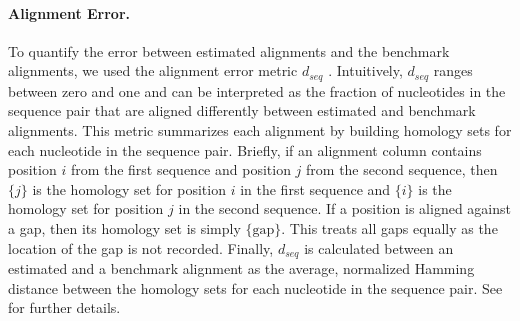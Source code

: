 \documentclass[12pt,letterpaper]{article}
\begin{document}
\paragraph{Alignment Error.}
To quantify the error between estimated alignments and the benchmark alignments, we used the alignment error metric $d_{seq}$ \citep{metrics_blackburne_whelan_2011}. Intuitively, $d_{seq}$ ranges between zero and one and can be interpreted as the fraction of nucleotides in the sequence pair that are aligned differently between estimated and benchmark alignments. This metric summarizes each alignment by building homology sets for each nucleotide in the sequence pair. Briefly, if an alignment column contains position $i$ from the first sequence and position $j$ from the second sequence, then $\{j\}$ is the homology set for position $i$ in the first sequence and $\{i\}$ is the homology set for position $j$ in the second sequence. If a position is aligned against a gap, then its homology set is simply $\{\text{gap}\}$. This treats all gaps equally as the location of the gap is not recorded. Finally, $d_{seq}$ is calculated  between an estimated and a benchmark alignment as the average, normalized Hamming distance between the homology sets for each nucleotide in the sequence pair. See \cite{metrics_blackburne_whelan_2011} for further details.



\end{document}
